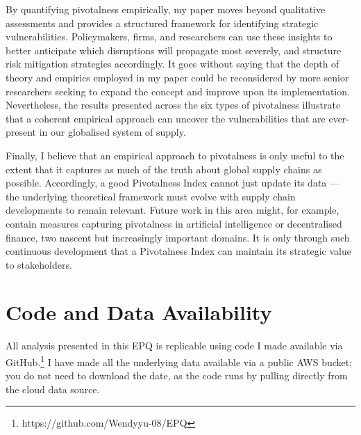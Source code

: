 \documentclass[11pt]{article}
\begin{document}
By quantifying pivotalness empirically, my paper moves beyond qualitative assessments and provides a structured framework for identifying strategic vulnerabilities. Policymakers, firms, and researchers can use these insights to better anticipate which disruptions will propagate most severely, and structure risk mitigation strategies accordingly. It goes without saying that the depth of theory and empirics employed in my paper could be reconsidered by more senior researchers seeking to expand the concept and improve upon its implementation. Nevertheless, the results presented across the six types of pivotalness illustrate that a coherent empirical approach can uncover the vulnerabilities that are ever-present in our globalised system of supply. 

Finally, I believe that an empirical approach to pivotalness is only useful to the extent that it captures as much of the truth about global supply chains as possible. Accordingly, a good Pivotalness Index cannot just update its data — the underlying theoretical framework must evolve with supply chain developments to remain relevant. Future work in this area might, for example, contain measures capturing pivotalness in artificial intelligence or decentralised finance, two nascent but increasingly important domains. It is only through such continuous development that a Pivotalness Index can maintain its strategic value to stakeholders.

\newpage

\raggedright
\let\oldthebibliography\thebibliography
\renewcommand\bf{}
\renewcommand\em{}


\newpage

\section*{Code and Data Availability}

All analysis presented in this EPQ is replicable using code I made available via GitHub.\footnote{https://github.com/Wendyyu-08/EPQ} I have made all the underlying data available via a public AWS bucket; you do not need to download the date, as the code runs by pulling directly from the cloud data source.
\end{document}
